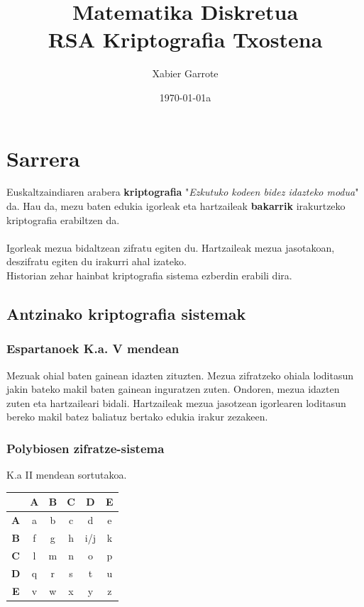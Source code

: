 \documentclass[12pt]{basque-book}
\begin{document}
\title{ \textbf{Matematika Diskretua\\ RSA Kriptografia Txostena} }

\author{Xabier Garrote}

\date{\today a}


\maketitle
\newpage
\tableofcontents
\newpage


\chapter{Sarrera}
Euskaltzaindiaren arabera \textbf{kriptografia} "\textit{Ezkutuko kodeen bidez idazteko modua}" da. Hau da, mezu baten edukia igorleak eta hartzaileak \textbf{bakarrik} irakurtzeko kriptografia erabiltzen da.
\\\\
Igorleak mezua bidaltzean zifratu egiten du. Hartzaileak mezua jasotakoan, deszifratu egiten du irakurri ahal izateko. 
\\
Historian zehar hainbat kriptografia sistema ezberdin erabili dira.

\section{Antzinako kriptografia sistemak}
\subsection{Espartanoek K.a. V mendean} Mezuak ohial baten gainean idazten zituzten. Mezua zifratzeko ohiala loditasun jakin bateko makil baten gainean inguratzen zuten. Ondoren, mezua idazten zuten eta hartzaileari bidali. Hartzaileak mezua jasotzean igorlearen loditasun bereko makil batez baliatuz bertako edukia irakur zezakeen.


\newpage


\subsection{Polybiosen zifratze-sistema}  K.a II mendean sortutakoa. 
\begin{center}
    \begin{tabular}{ c |c |c| c| c| c| }
        & \textbf{A}  & \textbf{B} & \textbf{C} & \textbf{D} & \textbf{E} \\
         \hline
        \textbf{A}  &a  & b & c & d & e \\ 
        \hline
        \textbf{B}  &f  & g & h & i/j & k\\  
        \hline
        \textbf{C}  & l  & m & n & o & p \\
        \hline
        \textbf{D}  & q  & r & s & t & u\\
        \hline
        \textbf{E}  & v  & w & x & y & z
    \end{tabular}
\end{center}
\end{document}
